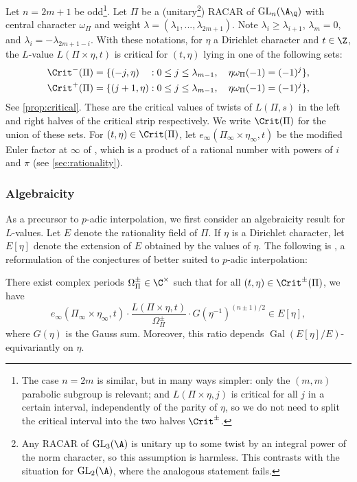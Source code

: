 \documentclass[10pt,reqno,a4paper]{amsart}
\newcommand{\GL}{\mathrm{GL}}
\begin{document}
Let $n = 2m+1$ be odd\footnote{The case $n=2m$ is similar, but in many ways simpler: only the $(m, m)$ parabolic subgroup is relevant; and $L(\Pi \times \eta, j)$ is critical for all $j$ in a certain interval, independently of the parity of $\eta$, so we do not need to split the critical interval into the two halves $\Crit^{\pm}$.}. Let $\Pi$ be a (unitary\footnote{Any RACAR of $\GL_3(\A)$ is unitary up to some twist by an integral power of the norm character, so this assumption is harmless. This contrasts with the situation for $\GL_2(\A)$, where the analogous statement fails.}) RACAR of $\GL_{n}(\A_{\Q})$ with central character $\omega_\Pi$ and weight $\lambda = (\lambda_1,...,\lambda_{2m+1})$. Note $\lambda_i \geq \lambda_{i+1}$, $\lambda_m = 0$, and $\lambda_i = -\lambda_{2m+1-i}$.
 With these notations, for $\eta$ a Dirichlet character and $t \in \Z$, the $L$-value $L(\Pi \times \eta, t)$ is critical for $(t, \eta)$ lying in one of the following sets:
\begin{align*}
	\Crit^-(\Pi) &= \{(-j,\eta) \ \ \ : 0 \leq j \leq \lambda_{m-1}, \ \ \  \eta\omega_{\Pi}(-1) = (-1)^{j}\},\\
	\Crit^+(\Pi) &=  \{(j+1,\eta) : 0\leq j \leq \lambda_{m-1},\ \ \  \eta\omega_{\Pi}(-1) = (-1)^{j}\},
\end{align*}
See \cref{prop:critical}. These are the critical values of twists of $L(\Pi,s)$ in the left and right halves of the critical strip respectively.   We write $\Crit(\Pi)$ for the union of these sets. For $(t, \eta) \in \Crit(\Pi)$, let  $e_\infty(\Pi_\infty \times \eta_\infty, t)$ be the modified Euler factor at $\infty$ of \cite[\S1]{coates89}, which is a product of a rational number with powers of $i$ and $\pi$ (see \cref{sec:rationality}).

\subsubsection*{Algebraicity} As a precursor to $p$-adic interpolation, we first consider an algebraicity result for $L$-values. Let $E$ denote the rationality field of $\Pi$. If $\eta$ is a Dirichlet character, let $E[\eta]$ denote the extension of $E$ obtained by the values of $\eta$. The following is \cite[Period Conjecture]{coates89}, a reformulation of the conjectures of \cite{Del79} better suited to $p$-adic interpolation:

\begin{conjectureintro}[Algebraicity Conjecture for $\GL_{2m+1}$]
	\label{conj:intro-alg}
	There exist complex periods $\Omega_\Pi^\pm \in \C^\times$ such that for all $(t,\eta) \in \Crit^\pm(\Pi)$, we have
	\begin{equation}
		\label{eq:deligne}
		e_\infty\left(\Pi_\infty \times \eta_\infty, t\right)\cdot \frac{L(\Pi\times\eta, t)}{\Omega_\Pi^\pm} \cdot G(\eta^{-1})^{(n \pm 1)/2} \in E[\eta],
	\end{equation}
	where $G(\eta)$ is the Gauss sum. Moreover, this ratio depends $\operatorname{Gal}(E[\eta] / E)$-equivariantly on $\eta$.
\end{conjectureintro}
\end{document}
